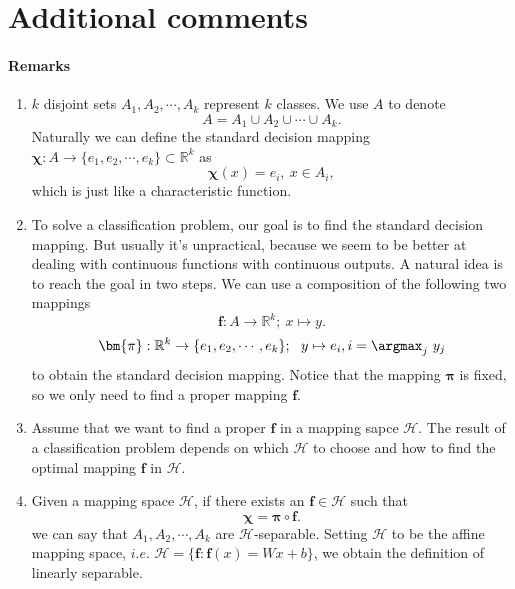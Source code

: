 \section{Additional comments}
\paragraph{\textbf{Remarks}}
\begin{enumerate}
	
	\item $k$ disjoint sets $A_1,A_2,\cdots,A_k$ represent $k$ classes. We use $A$ to denote
	\[
	A = A_1\cup A_2\cup \cdots \cup A_k. 
	\]
	Naturally we can define the standard decision mapping $\bm{\chi}:A \rightarrow \{e_1,e_2,\cdots,e_k\}\subset \mathbb{R}^k$  as
	\begin{equation}
	\bm{\chi}(x) = e_i,\ x\in A_i,
	\end{equation}
	which is just like a characteristic function.
	
	\item To solve a classification problem, our goal is to find the standard decision mapping. But usually it's unpractical, because we seem to be better at dealing with continuous functions with continuous outputs. A natural idea is to reach the goal in two steps. We can use a composition of the following two mappings 
	$$\bm{f}:A \rightarrow \mathbb{R}^k;\ x\mapsto y.$$
	$$\bm{\pi}: \mathbb{R}^k \rightarrow \{e_1,e_2,\cdots,e_k\};\ \ y\mapsto e_i,i = \argmax_j~y_j$$
	to obtain the standard decision mapping. Notice that the mapping $\bm{\pi}$ is fixed, so we only need to find a proper mapping $\bm{f}$. 
	
	\item Assume that we want to find a proper $\bm{f}$ in a mapping sapce $\mathscr{H}$. The result of a classification problem depends on which $\mathscr{H}$ to choose and how to find the optimal mapping $\bm{f}$ in $\mathscr{H}$.\\
	
	\item Given a mapping space $\mathscr{H}$, if there exists an $\mathbf{f}\in \mathscr{H}$ such that 
	\begin{equation}
	\bm{\chi} = \bm{\pi} \circ \bm{f}.
	\end{equation}
	we can say that $A_1,A_2,\cdots,A_k$ are $\mathscr{H}$-separable. Setting $\mathscr{H}$ to be the affine mapping space, $i.e.$ $\mathscr{H} = \{\bm{f}: \bm{f}(x) = Wx+b\}$, we obtain the definition of linearly separable.\\
	

\end{enumerate}
